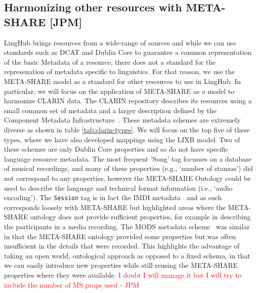 \documentclass{llncs}
\begin{document}
{\subsection{Harmonizing other resources with META-SHARE [JPM]}
\label{sec:harmonization}
LingHub brings resources from a wide-range of sources and while we can use
standards such as DCAT and Dublin Core to guarantee a common representation of the basic
Metadata of a resource, there does not a standard for the represenation of
metadata specific to linguistics. For that reason, we use the META-SHARE model
as a standard for other resources to use in LingHub. In particular, we will
focus on the application of META-SHARE as a model to harmonize CLARIN data. The
CLARIN repository describes its resources using a small common set of metadata
and a larger description defined by the Component Metadata
Infrastructure~\cite[CMDI]{broeder2012cmdi}. These metadata schemes are
extremely diverse as shown in table \ref{tab:clarin-types}. We will focus on the 
top five of these types, where we have also developed mappings using the LIXR 
model. Two of these schemes are only Dublin Core properties and so do not have 
specific language resource metadata. The most frequent 'Song' tag focusses on 
a database of musical recordings, and many of these properties (e.g., `number of
stanzas') did not correspond to any properties, however the META-SHARE Ontology 
could be used to describe the language and technical format information (i.e., `audio 
encoding'). The {\tt Session} tag is in fact the IMDI metadata~\cite{broeder2001imdi}
and as such corresponds loosely with META-SHARE but highlighted areas where the 
META-SHARE ontology does not provide sufficient properties, for example in 
describing the participants in a media recording. The MODS metadata scheme~\cite{todo} was 
similar in that the META-SHARE ontology provided some properties but was often
insufficient in the details that were recorded. This highlights the advantage of
taking an open world, ontological approach as opposed to a fixed schema, in that
we can easily introduce new properties while still reusing the META-SHARE properties
where they were available. \textcolor{red}{I doubt I will manage it but I will try
to include the number of MS props used - JPM}

}
\end{document}
